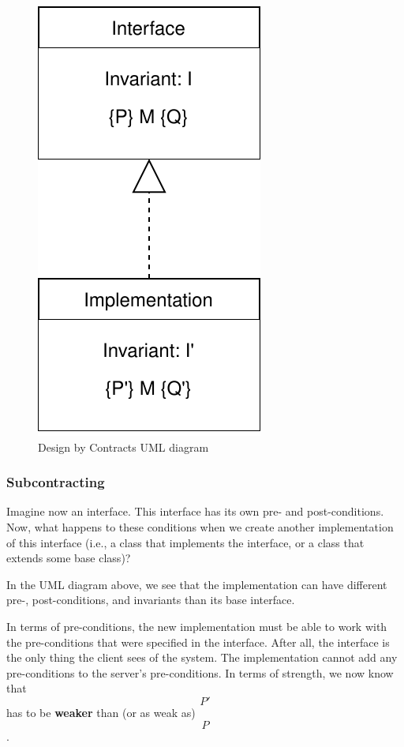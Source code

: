 \begin{figure}
\centering
\includegraphics{img/design-by-contracts/dbc_uml.svg}
\caption{Design by Contracts UML diagram}
\end{figure}

\hypertarget{subcontracting}{%
\subsubsection{Subcontracting}\label{subcontracting}}

Imagine now an interface. This interface has its own pre- and
post-conditions. Now, what happens to these conditions when we create
another implementation of this interface (i.e., a class that implements
the interface, or a class that extends some base class)?

In the UML diagram above, we see that the implementation can have
different pre-, post-conditions, and invariants than its base interface.

In terms of pre-conditions, the new implementation must be able to work
with the pre-conditions that were specified in the interface. After all,
the interface is the only thing the client sees of the system. The
implementation cannot add any pre-conditions to the server's
pre-conditions. In terms of strength, we now know that \[P'\] has to be
\textbf{weaker} than (or as weak as) \[P\].

